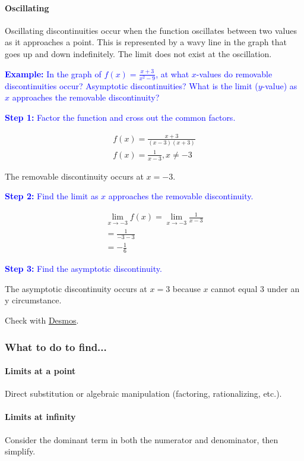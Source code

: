 \documentclass[letterpaper, 12pt]{article}
\newcommand{\example}[1]{\textcolor{blue}{\textbf{Example:} #1}}
\newcommand{\step}[2]{\textcolor{blue}{\textbf{Step #1:} #2}}
\begin{document}
\paragraph{Oscillating} Oscillating discontinuities occur when the function oscillates between two values as it approaches a point. This is represented by a wavy line in the graph that goes up and down indefinitely. The limit does not exist at the oscillation.

\example{In the graph of $\displaystyle f(x) = \frac{x+3}{x^2-9}$, at what $x$-values do removable discontinuities occur? Asymptotic discontinuities? What is the limit ($y$-value) as $x$ approaches the removable discontinuity?}

\step{1}{Factor the function and cross out the common factors.}

\begin{gather*}
f(x) = \frac{x+3}{(x-3)(x+3)} \\
f(x) = \frac{1}{x-3}, x \neq -3
\end{gather*}

The removable discontinuity occurs at $ x = -3 $.

\step{2}{Find the limit as $x$ approaches the removable discontinuity.}

\begin{gather*}
\lim_{x \to -3} f(x)
= \lim_{x \to -3} \frac{1}{x-3} \\
= \frac{1}{-3-3} \\
= \boxed{-\frac{1}{6}}
\end{gather*}

\step{3}{Find the asymptotic discontinuity.}

The asymptotic discontinuity occurs at $ x = 3 $ because $x$ cannot equal 3 under an y circumstance.

Check with \href{https://www.desmos.com/calculator}{Desmos}.

\subsubsection*{What to do to find...}

\paragraph{Limits at a point} Direct substitution or algebraic manipulation (factoring, rationalizing, etc.).

\paragraph{Limits at infinity} Consider the dominant term in both the numerator and denominator, then simplify.
\end{document}
